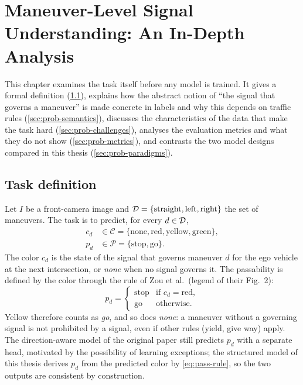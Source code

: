 \chapter{Maneuver-Level Signal Understanding: An In-Depth Analysis}
\label{ch:problem}

This chapter examines the task itself before any model is trained. It gives a formal definition
(\cref{sec:prob-def}), explains how the abstract notion of ``the signal that governs a maneuver'' is
made concrete in labels and why this depends on traffic rules (\cref{sec:prob-semantics}), discusses
the characteristics of the data that make the task hard (\cref{sec:prob-challenges}), analyses the
evaluation metrics and what they do not show (\cref{sec:prob-metrics}), and contrasts the two model
designs compared in this thesis (\cref{sec:prob-paradigms}).

\section{Task definition}
\label{sec:prob-def}

Let $I$ be a front-camera image and $\mathcal{D}=\{\text{straight},\text{left},\text{right}\}$
the set of maneuvers. The task is to predict, for every $d\in\mathcal{D}$,
\begin{align}
  c_d &\in \mathcal{C} = \{\text{none},\text{red},\text{yellow},\text{green}\}, \\
  p_d &\in \mathcal{P} = \{\text{stop},\text{go}\}.
\end{align}
The color $c_d$ is the state of the signal that governs maneuver $d$ for the ego vehicle at the next
intersection, or \emph{none} when no signal governs it. The passability is defined by the color through
the rule of Zou et al.\ (legend of their Fig.~2):
\begin{equation}
  p_d = \begin{cases} \text{stop} & \text{if } c_d = \text{red},\\ \text{go} & \text{otherwise.}\end{cases}
  \label{eq:pass-rule}
\end{equation}
Yellow therefore counts as \emph{go}, and so does \emph{none}: a maneuver without a governing signal is
not prohibited by a signal, even if other rules (yield, give way) apply. The direction-aware model of
the original paper still predicts $p_d$ with a separate head, motivated by the possibility of learning
exceptions; the structured model of this thesis derives $p_d$ from the predicted color by
\cref{eq:pass-rule}, so the two outputs are consistent by construction.

